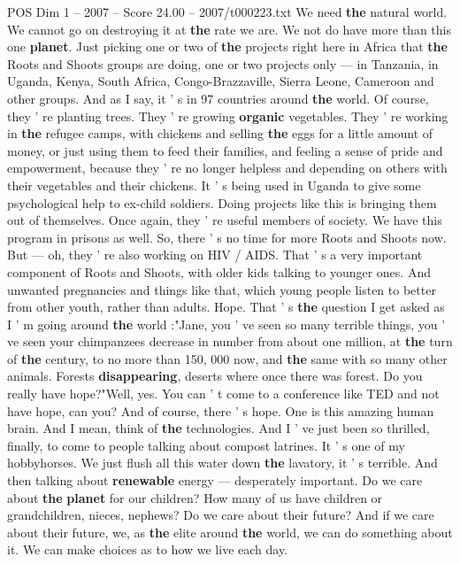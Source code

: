 \begin{textsample}{POS Dim 1 – 2007 – Score 24.00 – 2007/t000223.txt}
We need \textbf{the} natural world.
We cannot go on destroying it at \textbf{the} rate we are.
We not do have more than this one \textbf{planet}.
Just picking one or two of \textbf{the} projects right here in Africa that \textbf{the} Roots and Shoots groups are doing, one or two projects only — in Tanzania, in Uganda, Kenya, South Africa, Congo-Brazzaville, Sierra Leone, Cameroon and other groups.
And as I say, it ' s in 97 countries around \textbf{the} world.
Of course, they ' re planting trees.
They ' re growing \textbf{organic} vegetables.
They ' re working in \textbf{the} refugee camps, with chickens and selling \textbf{the} eggs for a little amount of money, or just using them to feed their families, and feeling a sense of pride and empowerment, because they ' re no longer helpless and depending on others with their vegetables and their chickens.
It ' s being used in Uganda to give some psychological help to ex-child soldiers.
Doing projects like this is bringing them out of themselves.
Once again, they ' re useful members of society.
We have this program in prisons as well.
So, there ' s no time for more Roots and Shoots now.
But — oh, they ' re also working on HIV / AIDS.
That ' s a very important component of Roots and Shoots, with older kids talking to younger ones.
And unwanted pregnancies and things like that, which young people listen to better from other youth, rather than adults.
Hope.
That ' s \textbf{the} question I get asked as I ' m going around \textbf{the} world :"Jane, you ' ve seen so many terrible things, you ' ve seen your chimpanzees decrease in number from about one million, at \textbf{the} turn of \textbf{the} century, to no more than 150, 000 now, and \textbf{the} same with so many other animals.
Forests \textbf{disappearing}, deserts where once there was forest.
Do you really have hope?"Well, yes.
You can ' t come to a conference like TED and not have hope, can you?
And of course, there ' s hope.
One is this amazing human brain.
And I mean, think of \textbf{the} technologies.
And I ' ve just been so thrilled, finally, to come to people talking about compost latrines.
It ' s one of my hobbyhorses.
We just flush all this water down \textbf{the} lavatory, it ' s terrible.
And then talking about \textbf{renewable} energy — desperately important.
Do we care about \textbf{the} \textbf{planet} for our children?
How many of us have children or grandchildren, nieces, nephews?
Do we care about their future?
And if we care about their future, we, as \textbf{the} elite around \textbf{the} world, we can do something about it.
We can make choices as to how we live each day.

\end{textsample}
